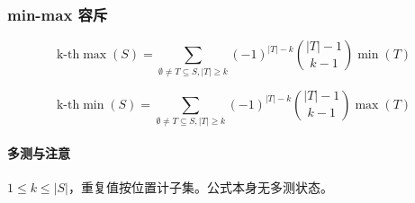 \subsubsection{min-max 容斥}

$$
	\text{k-th}\max(S) = \sum_{\emptyset \neq T \subseteq S, |T| \ge k} (-1)^{|T|-k} \binom{|T|-1}{k-1} \min(T)$$


	$$\text{k-th}\min(S) = \sum_{\emptyset \neq T \subseteq S, |T| \ge k} (-1)^{|T|-k} \binom{|T|-1}{k-1} \max(T)
$$

\paragraph{多测与注意} $1\le k\le|S|$，重复值按位置计子集。公式本身无多测状态。
